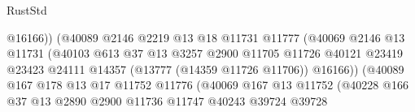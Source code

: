 \begin{lexlean}{RustStd}
\begin{coremodule}
                                              @16166))
                                          (@40089
                                            @2146
                                            @2219
                                            @13
                                            @18
                                            @11731
                                            @11777
                                            (@40069
                                              @2146
                                              @13
                                              @11731
                                              (@40103
                                                @613
                                                @37
                                                @13
                                                @3257
                                                @2900
                                                @11705
                                                @11726
                                                @40121
                                                @23419
                                                @23423
                                                @24111
                                                @14357
                                                (@13777 (@14359 @11726 @11706))
                                                @16166))
                                            (@40089
                                              @167
                                              @178
                                              @13
                                              @17
                                              @11752
                                              @11776
                                              (@40069
                                                @167
                                                @13
                                                @11752
                                                (@40228
                                                  @166
                                                  @37
                                                  @13
                                                  @2890
                                                  @2900
                                                  @11736
                                                  @11747
                                                  @40243
                                                  @39724
                                                  @39728

\end{coremodule}
\end{lexlean}

